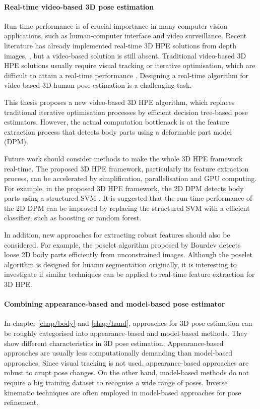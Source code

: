 \paragraph{Real-time video-based 3D pose estimation}
Run-time performance is of crucial importance in many computer vision applications, such as human-computer interface and video surveillance. Recent literature has already implemented real-time 3D HPE solutions from depth images, \eg \cite{Baak2011, Girshick2011, Sun2012}, but a video-based solution is still absent. Traditional video-based 3D HPE solutions usually require visual tracking or iterative optimisation, which are difficult to attain a real-time performance \cite{Pons-Moll2011, Sigal2012}. Designing a real-time algorithm for video-based 3D human pose estimation is a challenging task. 

This thesis proposes a new video-based 3D HPE algorithm, which replaces traditional iterative optimisation processes by efficient decision tree-based pose estimators. However, the actual computation bottlenack is at the feature extraction process that detects body parts using a deformable part model (DPM). 

Future work should consider methods to make the whole 3D HPE framework real-time. 
The proposed 3D HPE framework, particularly its feature extraction process, can be accelerated by simplification, parallelisation and GPU computing. 
For example, in the proposed 3D HPE framework, the 2D DPM detects body parts using a structured SVM \cite{Yang2011}. It is suggested that the run-time performance of the 2D DPM can be improved by replacing the structured SVM with a efficient classifier, such as boosting or random forest.

In addition, new approaches for extracting robust features should also be considered.  
For example, the poselet algorithm proposed by Bourdev \etal \cite{Bourdev2009} detects loose 2D body parts efficiently from unconstrained images. Although the poselet algorithm is designed for huamn segmentation originally, it is interesting to investigate if similar techniques can be applied to real-time feature extraction for 3D HPE. 

\paragraph{Combining appearance-based and model-based pose estimator}

In chapter \ref{chap/body} and \ref{chap/hand}, approaches for 3D pose estimation can be roughly categorised into appearance-based and model-based methods.  They show different characteristics in 3D pose estimation.
Appearance-based approaches are usually less computationally demanding than model-based approaches. 
Since visual tracking is not used, appearance-based approaches are robust to arupt pose changes.
On the other hand, model-based methods do not require a big training dataset to recognise a wide range of poses. Inverse kinematic techniques are often employed in model-based approaches for pose refinement. 

